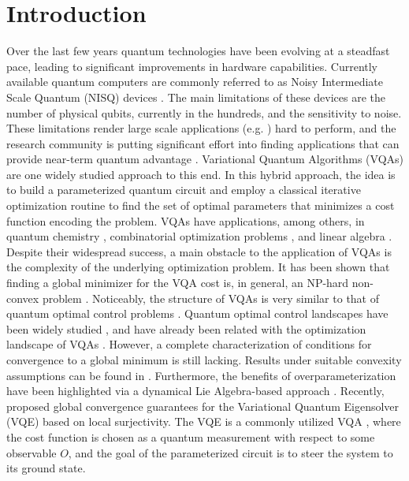 \documentclass[letterpaper, 10 pt]{IEEEtran}  %
\begin{document}
\section{Introduction}
Over the last few years quantum technologies have been evolving at a steadfast pace, leading to significant improvements in hardware capabilities. 
Currently available quantum computers are commonly referred to as Noisy Intermediate Scale Quantum (NISQ) devices \cite{Preskill2018}. 
The main limitations of these devices are the number of physical qubits, currently in the hundreds, and the sensitivity to noise. 
These limitations render large scale applications (e.g. \cite{Shor1997}) hard to perform, and the research community is putting significant effort into finding applications that can provide near-term quantum advantage \cite{Kim2023,Arute2019}. 
Variational Quantum Algorithms (VQAs) \cite{Cerezo2021} are one widely studied approach to this end. 
In this hybrid approach, the idea is to build a parameterized quantum circuit and employ a classical iterative optimization routine to find the set of optimal parameters that minimizes a cost function encoding the problem. 
VQAs have applications, among others, in quantum chemistry \cite{Keijzer2022,Grimsley2019}, combinatorial optimization problems \cite{Farhi2014}, and linear algebra \cite{BravoPrieto2023}.
Despite their widespread success, a main obstacle to the application of VQAs is the complexity of the underlying optimization problem.  It has been shown that finding a global minimizer for the VQA cost is, in general, an NP-hard non-convex problem \cite{Bittel2021}. 
Noticeably, the structure of VQAs is very similar to that of quantum optimal control problems \cite{Magann2021,Berberich2024}. Quantum optimal control landscapes have been widely studied \cite{Chakrabarti2007}, and have already been related with the
optimization landscape of VQAs \cite{Ge2022,Huembeli2021}. However, a complete characterization of conditions for convergence to a global minimum is still lacking. Results under suitable convexity assumptions can be found in \cite{Harrow2021,Sweke2020}. 
Furthermore, the benefits of overparameterization have been highlighted via a dynamical Lie Algebra-based approach \cite{Larocca2023}. Recently, \cite{Wiedmann2025} proposed global convergence guarantees for the Variational Quantum Eigensolver (VQE) based on local surjectivity.
The VQE is a commonly utilized VQA \cite{Peruzzo2014,Tilly2022}, where the cost function is chosen as a quantum measurement with respect to some observable $O$, and the goal of the parameterized circuit is to steer the system to its ground state.
\newline
\end{document}
